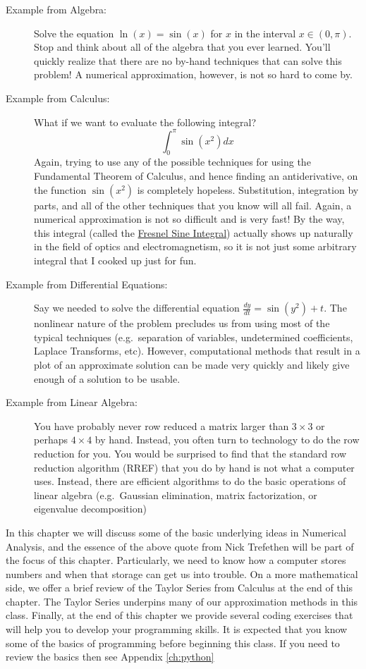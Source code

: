 \documentclass[
]{book}
\theoremstyle{definition}
\theoremstyle{definition}
\theoremstyle{definition}
\theoremstyle{remark}
\begin{document}
\begin{description}
\item[Example from Algebra:]
Solve the equation \(\ln(x) = \sin(x)\) for \(x\) in the interval \(x \in (0,\pi)\). Stop and think about all of the algebra that you ever learned. You'll quickly realize that there are no by-hand techniques that can solve this problem! A numerical approximation, however, is not so hard to come by.
\item[Example from Calculus:]
What if we want to evaluate the following integral?
\[ \int_0^\pi \sin(x^2) dx \]
Again, trying to use any of the possible techniques for using the Fundamental Theorem of Calculus, and hence finding an antiderivative, on the function \(\sin(x^2)\) is completely hopeless. Substitution, integration by parts, and all of the other techniques that you know will all fail. Again, a numerical approximation is not so difficult and is very fast! By the way, this integral (called the \href{https://en.wikipedia.org/wiki/Fresnel_integral}{Fresnel Sine Integral}) actually shows up naturally in the field of optics and electromagnetism, so it is not just some arbitrary integral that I cooked up just for fun.
\item[Example from Differential Equations:]
Say we needed to solve the differential equation \(\frac{dy}{dt} = \sin(y^2) + t.\) The nonlinear nature of the problem precludes us from using most of the typical techniques (e.g.~separation of variables, undetermined coefficients, Laplace Transforms, etc). However, computational methods that result in a plot of an approximate solution can be made very quickly and likely give enough of a solution to be usable.
\item[Example from Linear Algebra:]
You have probably never row reduced a matrix larger than \(3\times 3\) or perhaps \(4 \times 4\) by hand. Instead, you often turn to technology to do the row reduction for you. You would be surprised to find that the standard row reduction algorithm (RREF) that you do by hand is not what a computer uses. Instead, there are efficient algorithms to do the basic operations of linear algebra (e.g.~Gaussian elimination, matrix factorization, or eigenvalue decomposition)
\end{description}

In this chapter we will discuss some of the basic underlying ideas in
Numerical Analysis, and the essence of the above quote from Nick
Trefethen will be part of the focus of this chapter. Particularly, we
need to know how a computer stores numbers and when that storage can get
us into trouble. On a more mathematical side, we offer a brief review of
the Taylor Series from Calculus at the end of this chapter. The Taylor
Series underpins many of our approximation methods in this class.
Finally, at the end of this chapter we provide several coding exercises
that will help you to develop your programming skills. It is expected
that you know some of the basics of programming before beginning this
class. If you need to review the basics then see Appendix \ref{ch:python}
\end{document}
